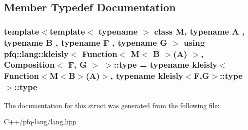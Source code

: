 \subsection{Member Typedef Documentation}
\hypertarget{structpfq_1_1lang_1_1kleisly_3_01Function_3_01M_3_01B_01_4_07A_08_01_4_00_01Composition_3_01F_00_01G_01_4_01_4_aa5c026817ce615e5e51ed76159b2e759}{
\subsubsection[{type}]{\setlength{\rightskip}{0pt plus 5cm}template$<$template$<$ typename $>$ class M, typename A , typename B , typename F , typename G $>$ using {\bf pfq\+::lang\+::kleisly}$<$ {\bf Function}$<$ M$<$ B $>$(A) $>$, {\bf Composition}$<$ F, G $>$ $>$\+::{\bf type} =  typename {\bf kleisly}$<$ {\bf Function}$<$M$<$B$>$(A)$>$, typename {\bf kleisly}$<$F,G$>$\+::{\bf type}$>$\+::{\bf type}}}\label{structpfq_1_1lang_1_1kleisly_3_01Function_3_01M_3_01B_01_4_07A_08_01_4_00_01Composition_3_01F_00_01G_01_4_01_4_aa5c026817ce615e5e51ed76159b2e759}


The documentation for this struct was generated from the following file\+:\begin{DoxyCompactItemize}
\item 
C++/pfq-\/lang/\hyperlink{lang_8hpp}{lang.\+hpp}\end{DoxyCompactItemize}
